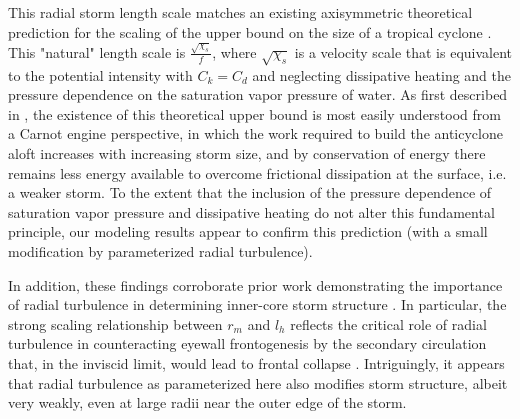 \documentclass[12pt]{article}
\begin{document}
This radial storm length scale matches an existing axisymmetric theoretical prediction for the scaling of the upper bound on the size of a tropical cyclone \citep{Emanuel_1986, Emanuel_1989, Emanuel_1995a}. This "natural" length scale is $\frac{\sqrt{\chi_s}}{f}$, where $\sqrt{\chi_s}$ is a velocity scale that is equivalent to the potential intensity with $C_k = C_d$ and neglecting dissipative heating and the pressure dependence on the saturation vapor pressure of water. As first described in \cite{Emanuel_1986}, the existence of this theoretical upper bound is most easily understood from a Carnot engine perspective, in which the work required to build the anticyclone aloft increases with increasing storm size, and by conservation of energy there remains less energy available to overcome frictional dissipation at the surface, i.e. a weaker storm.  To the extent that the inclusion of the pressure dependence of saturation vapor pressure and dissipative heating do not alter this fundamental principle, our modeling results appear to confirm this prediction (with a small modification by parameterized radial turbulence).

In addition, these findings corroborate prior work demonstrating the importance of radial turbulence in determining inner-core storm structure \citep{Bryan_Rotunno_2009, Bryan_2011}. In particular, the strong scaling relationship between $r_m$ and $l_h$ reflects the critical role of radial turbulence in counteracting eyewall frontogenesis by the secondary circulation that, in the inviscid limit, would lead to frontal collapse \citep{Emanuel_1997}. Intriguingly, it appears that radial turbulence as parameterized here also modifies storm structure, albeit very weakly, even at large radii near the outer edge of the storm. 
\end{document}
